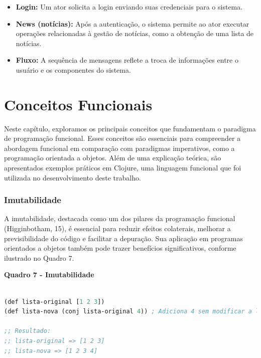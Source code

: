 \begin{itemize}
    \item \textbf{Login:} Um ator solicita a login enviando suas credenciais para o sistema.
    \item \textbf{News (notícias):} Após a autenticação, o sistema permite ao ator executar operações relacionadas à gestão de notícias, como a obtenção de uma lista de notícias.
    \item \textbf{Fluxo:} A sequência de mensagens reflete a troca de informações entre o usuário e os componentes do sistema.
\end{itemize}





\chapter{Conceitos Funcionais}

Neste capítulo, exploramos os principais conceitos que fundamentam o paradigma de programação funcional. Esses conceitos são essenciais para compreender a abordagem funcional em comparação com paradigmas imperativos, como a programação orientada a objetos. Além de uma explicação teórica, são apresentados exemplos práticos em Clojure, uma linguagem funcional que foi utilizada no desenvolvimento deste trabalho.


\subsection{Imutabilidade}

A imutabilidade, destacada como um dos pilares da programação funcional (Higginbotham, 15), é essencial para reduzir efeitos colaterais, melhorar a previsibilidade do código e facilitar a depuração. Sua aplicação em programas orientados a objetos também pode trazer benefícios significativos, conforme ilustrado no Quadro 7.

\begin{center}
    \textbf{Quadro 7 - Imutabilidade}
\end{center}

\begin{tcolorbox}[colback=gray!5!white, colframe=gray!75!black, title=]
\begin{lstlisting}[language=Lisp]

(def lista-original [1 2 3])
(def lista-nova (conj lista-original 4)) ; Adiciona 4 sem modificar a lista original

;; Resultado:
;; lista-original => [1 2 3]
;; lista-nova => [1 2 3 4]

\end{lstlisting}
\end{tcolorbox}

